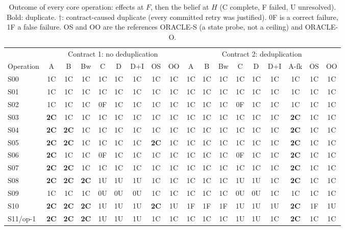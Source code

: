 \documentclass[11pt]{article}
\begin{document}
\begin{table}[!htbp]
\centering
\footnotesize
\setlength{\tabcolsep}{2.6pt}
\caption{Outcome of every core operation: effects at $F$, then the belief at $H$ (C complete, F failed, U unresolved). Bold: duplicate. $\dagger$: contract-caused duplicate (every committed retry was justified). 0F is a correct failure, 1F a false failure. OS and OO are the references ORACLE-S (a state probe, not a ceiling) and ORACLE-O.}
\label{tab:outcomes}
\begin{tabular}{@{}l*{8}{c}|*{9}{c}@{}}
\toprule
 & \multicolumn{8}{c|}{Contract 1: no deduplication} & \multicolumn{9}{c}{Contract 2: deduplication} \\
Operation & A & B & Bw & C & D & D+I & OS & OO & A & B & Bw & C & D & D+I & A-fk & OS & OO \\
\midrule
S00 & 1C & 1C & 1C & 1C & 1C & 1C & 1C & 1C & 1C & 1C & 1C & 1C & 1C & 1C & 1C & 1C & 1C \\
S01 & 1C & 1C & 1C & 1C & 1C & 1C & 1C & 1C & 1C & 1C & 1C & 1C & 1C & 1C & 1C & 1C & 1C \\
S02 & 1C & 1C & 1C & 0F & 1C & 1C & 1C & 1C & 1C & 1C & 1C & 0F & 1C & 1C & 1C & 1C & 1C \\
S03 & \textbf{2C} & 1C & 1C & 1C & 1C & 1C & 1C & 1C & 1C & 1C & 1C & 1C & 1C & 1C & \textbf{2C} & 1C & 1C \\
S04 & \textbf{2C} & \textbf{2C} & 1C & 1C & 1C & 1C & 1C & 1C & 1C & 1C & 1C & 1C & 1C & 1C & \textbf{2C} & 1C & 1C \\
S05 & \textbf{2C} & \textbf{2C} & 1C & 1C & 1C & 1C & \textbf{2C} & 1C & 1C & 1C & 1C & 1C & 1C & 1C & \textbf{2C} & 1C & 1C \\
S06 & \textbf{2C} & 1C & 1C & 0F & 1C & 1C & 1C & 1C & 1C & 1C & 1C & 0F & 1C & 1C & \textbf{2C} & 1C & 1C \\
S07 & \textbf{2C} & \textbf{2C} & 1C & 1C & 1C & 1C & 1C & 1C & 1C & 1C & 1C & 1C & 1C & 1C & \textbf{2C} & 1C & 1C \\
S08 & \textbf{2C} & \textbf{2C} & \textbf{2C} & 1U & 1U & 1U & 1C & 1C & 1C & 1C & 1C & 1U & 1U & 1C & \textbf{2C} & 1C & 1C \\
S09 & 1C & 1C & 1C & 0U & 0U & 0U & 1C & 1C & 1C & 1C & 1C & 0U & 0U & 1C & 1C & 1C & 1C \\
S10 & \textbf{2C} & \textbf{2C} & \textbf{2C} & 1U & 1U & 1U & \textbf{2C} & 1U & 1F & 1F & 1F & 1U & 1U & 1U & \textbf{2C} & 1F & 1U \\
S11/op-1 & \textbf{2C} & \textbf{2C} & \textbf{2C} & 1U & 1U & 1U & 1C & 1C & 1C & 1C & 1C & 1U & 1U & 1C & \textbf{2C} & 1C & 1C \\

\end{tabular}
\end{table}
\end{document}
